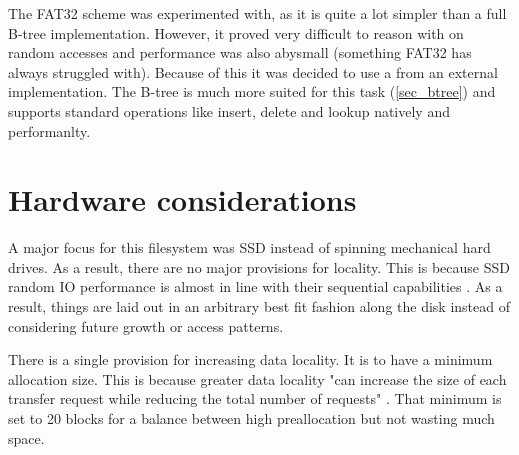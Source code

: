         The FAT32 scheme was experimented with, as it is quite a lot simpler
        than a full B-tree implementation. However, it proved very difficult to
        reason with on random accesses and performance was also abysmall
        (something FAT32 has always struggled with). Because of this it was
        decided to use a \bplustree from an external implementation. The B-tree
        is much more suited for this task (\ref{sec_btree}) and supports
        standard operations like insert, delete and lookup natively and
        performanlty.

    \section{Hardware considerations}
        \label{sec_hardware}

        A major focus for this filesystem was SSD instead of spinning
        mechanical hard drives. As a result, there are no major provisions for
        locality. This is because SSD random IO performance is almost in line
        with their sequential capabilities \cite{something}. As a result,
        things are laid out in an arbitrary best fit fashion along the disk
        instead of considering future growth or access patterns.

        There is a single provision for increasing data locality. It is to have
        a minimum allocation size. This is because greater data locality "can
        increase the size of each transfer request while reducing the total
        number of requests" \cite{EXT documentation}. That minimum is set to 20
        blocks for a balance between high preallocation but not wasting much
        space.
